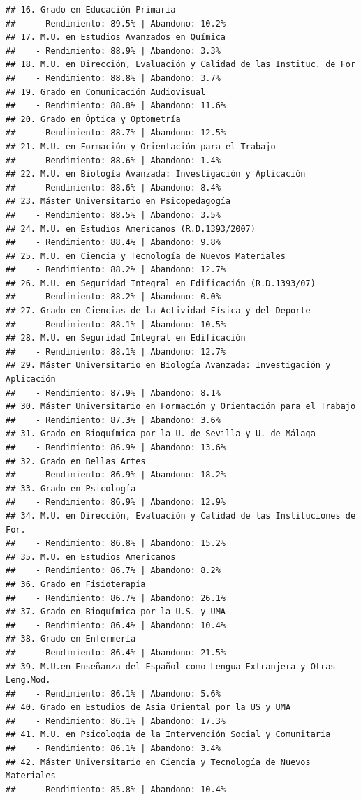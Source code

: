 \documentclass[
]{article}
\begin{document}
\begin{verbatim}
## 16. Grado en Educación Primaria
##    - Rendimiento: 89.5% | Abandono: 10.2%
## 17. M.U. en Estudios Avanzados en Química
##    - Rendimiento: 88.9% | Abandono: 3.3%
## 18. M.U. en Dirección, Evaluación y Calidad de las Instituc. de For
##    - Rendimiento: 88.8% | Abandono: 3.7%
## 19. Grado en Comunicación Audiovisual
##    - Rendimiento: 88.8% | Abandono: 11.6%
## 20. Grado en Óptica y Optometría
##    - Rendimiento: 88.7% | Abandono: 12.5%
## 21. M.U. en Formación y Orientación para el Trabajo
##    - Rendimiento: 88.6% | Abandono: 1.4%
## 22. M.U. en Biología Avanzada: Investigación y Aplicación
##    - Rendimiento: 88.6% | Abandono: 8.4%
## 23. Máster Universitario en Psicopedagogía
##    - Rendimiento: 88.5% | Abandono: 3.5%
## 24. M.U. en Estudios Americanos (R.D.1393/2007)
##    - Rendimiento: 88.4% | Abandono: 9.8%
## 25. M.U. en Ciencia y Tecnología de Nuevos Materiales
##    - Rendimiento: 88.2% | Abandono: 12.7%
## 26. M.U. en Seguridad Integral en Edificación (R.D.1393/07)
##    - Rendimiento: 88.2% | Abandono: 0.0%
## 27. Grado en Ciencias de la Actividad Física y del Deporte
##    - Rendimiento: 88.1% | Abandono: 10.5%
## 28. M.U. en Seguridad Integral en Edificación
##    - Rendimiento: 88.1% | Abandono: 12.7%
## 29. Máster Universitario en Biología Avanzada: Investigación y Aplicación
##    - Rendimiento: 87.9% | Abandono: 8.1%
## 30. Máster Universitario en Formación y Orientación para el Trabajo
##    - Rendimiento: 87.3% | Abandono: 3.6%
## 31. Grado en Bioquímica por la U. de Sevilla y U. de Málaga
##    - Rendimiento: 86.9% | Abandono: 13.6%
## 32. Grado en Bellas Artes
##    - Rendimiento: 86.9% | Abandono: 18.2%
## 33. Grado en Psicología
##    - Rendimiento: 86.9% | Abandono: 12.9%
## 34. M.U. en Dirección, Evaluación y Calidad de las Instituciones de For.
##    - Rendimiento: 86.8% | Abandono: 15.2%
## 35. M.U. en Estudios Americanos
##    - Rendimiento: 86.7% | Abandono: 8.2%
## 36. Grado en Fisioterapia
##    - Rendimiento: 86.7% | Abandono: 26.1%
## 37. Grado en Bioquímica por la U.S. y UMA
##    - Rendimiento: 86.4% | Abandono: 10.4%
## 38. Grado en Enfermería
##    - Rendimiento: 86.4% | Abandono: 21.5%
## 39. M.U.en Enseñanza del Español como Lengua Extranjera y Otras Leng.Mod.
##    - Rendimiento: 86.1% | Abandono: 5.6%
## 40. Grado en Estudios de Asia Oriental por la US y UMA
##    - Rendimiento: 86.1% | Abandono: 17.3%
## 41. M.U. en Psicología de la Intervención Social y Comunitaria
##    - Rendimiento: 86.1% | Abandono: 3.4%
## 42. Máster Universitario en Ciencia y Tecnología de Nuevos Materiales
##    - Rendimiento: 85.8% | Abandono: 10.4%

\end{verbatim}
\end{document}
